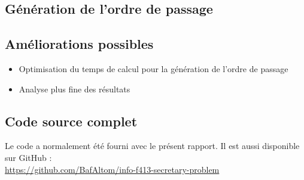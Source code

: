 \documentclass[a4paper,10pt]{article}
\begin{document}
\subsection{Génération de l'ordre de passage}

\subsection{Améliorations possibles}

\begin{itemize}
  \item Optimisation du temps de calcul pour la génération de l'ordre de passage
  \item Analyse plus fine des résultats
\end{itemize}


\subsection{Code source complet}
Le code a normalement été fourni avec le présent rapport. Il est aussi disponible sur GitHub :\\
\url{https://github.com/BafAltom/info-f413-secretary-problem}

\fontfamily{}
\end{document}
